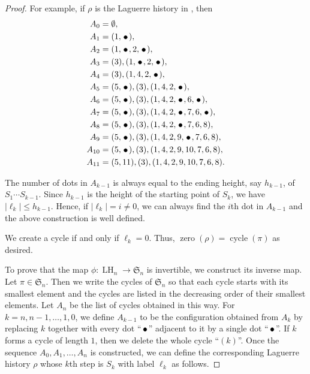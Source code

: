 \documentclass[oneside]{book}
\numberwithin{equation}{section}
\theoremstyle{definition}
\newcommand\zero{\operatorname{zero}}
\newcommand\LH{\operatorname{LH}}
\newcommand\cycle{\operatorname{cycle}}
\newcommand\sym{\mathfrak{S}}
\def\fcirc{\,\tikz\draw[fill] (0,0) circle (2pt);\,}
\begin{document}
\begin{proof}
For example, if \( \rho \) is the Laguerre history in ,
then
\begin{align*}
A_{0} &= \emptyset,\\
A_{1} &= (1,\fcirc),\\
A_{2} &= (1,\fcirc,2,\fcirc),\\
A_{3} &= (3),(1,\fcirc,2,\fcirc),\\
A_{4} &= (3),(1,4,2,\fcirc),\\
A_{5} &= (5,\fcirc),(3),(1,4,2,\fcirc),\\
A_{6} &= (5,\fcirc),(3),(1,4,2,\fcirc,6,\fcirc),\\
A_{7} &= (5,\fcirc),(3),(1,4,2,\fcirc,7,6,\fcirc),\\
A_{8} &= (5,\fcirc),(3),(1,4,2,\fcirc,7,6,8),\\
A_{9} &= (5,\fcirc),(3),(1,4,2,9,\fcirc,7,6,8),\\
A_{10} &= (5,\fcirc),(3),(1,4,2,9,10,7,6,8),\\
A_{11} &= (5,11),(3),(1,4,2,9,10,7,6,8).
\end{align*}

The number of dots in \( A_{k-1} \) is always equal to the ending
height, say \( h_{k-1} \), of \( S_1 \cdots S_{k-1} \). Since
\( h_{k-1} \) is the height of the starting point of \( S_k \), we
have \( |\ell_k|\le h_{k-1} \). Hence, if \( |\ell_k|=i \ne 0 \), we
can always find the \( i \)th dot in \( A_{k-1} \) and the above
construction is well defined.

We create a cycle if and only if \( \ell_k=0 \).
Thus, \( \zero(\rho) = \cycle(\pi) \) as desired.

To prove that the map \( \phi:\LH_n\to \sym_n \) is invertible, we
construct its inverse map. Let \( \pi\in \sym_n \). Then we write the
cycles of \( \sym_n \) so that each cycle starts with its smallest
element and the cycles are listed in the decreasing order of their
smallest elements. Let \( A_n \) be the list of cycles obtained in
this way. For \( k=n,n-1,\dots,1,0 \), we define \( A_{k-1} \) to be
the configuration obtained from \( A_k \) by replacing \( k \)
together with every dot ``\( \fcirc \)'' adjacent to it by a single
dot ``\( \fcirc \)''. If \( k \) forms a cycle of length \( 1 \), then
we delete the whole cycle ``\( (k)\)''. Once the sequence
\( A_0, A_1,\dots,A_n \) is constructed, we can define the
corresponding Laguerre history \( \rho \) whose \( k \)th step is
\( S_k \) with label \( \ell_k \) as follows.


\end{proof}
\end{document}
